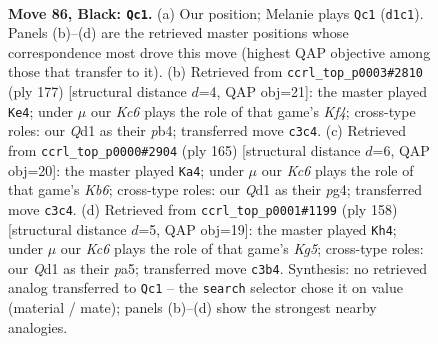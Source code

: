 \documentclass[11pt]{article}
\begin{document}
\clearpage

\begin{figure}[p]\centering
\begin{subfigure}{0.46\textwidth}\centering
\resizebox{\linewidth}{!}{%
\newchessgame
\chessboard[
  setfen={8/8/1p6/p7/2P5/2k5/K7/3q4 b - - 29 86},
  showmover=false,
  pgfstyle=straightmove, color=movearrow, markmove={d1-c1}
]}
\caption{}
\end{subfigure}\hfill
\begin{subfigure}{0.46\textwidth}\centering
\resizebox{\linewidth}{!}{%
\newchessgame
\chessboard[
  setfen={8/6p1/6Pp/5k2/1P6/6K1/8/8 b - - 10 89},
  showmover=false,
  pgfstyle=straightmove, color=movearrow, markmove={f5-e4}
]}
\caption{}
\end{subfigure}
\\[4pt]
\begin{subfigure}{0.46\textwidth}\centering
\resizebox{\linewidth}{!}{%
\newchessgame
\chessboard[
  setfen={8/8/8/6p1/5pP1/1kPK4/8/8 b - - 2 83},
  showmover=false,
  pgfstyle=straightmove, color=movearrow, markmove={b3-a4}
]}
\caption{}
\end{subfigure}\hfill
\begin{subfigure}{0.46\textwidth}\centering
\resizebox{\linewidth}{!}{%
\newchessgame
\chessboard[
  setfen={8/5k2/8/p5Kp/2P5/1P6/8/8 w - - 7 80},
  showmover=false,
  pgfstyle=straightmove, color=movearrow, markmove={g5-h4}
]}
\caption{}
\end{subfigure}
\caption{\textbf{Move 86, Black: \texttt{Qc1}.} (a) Our position; Melanie plays \texttt{Qc1} (\texttt{d1c1}). Panels (b)--(d) are the retrieved master positions whose correspondence most drove this move (highest QAP objective among those that transfer to it). (b) Retrieved from \texttt{ccrl\_top\_p0003\#2810} (ply 177) [structural distance $d$=4, QAP obj=21]: the master played \texttt{Ke4}; under $\mu$ our \emph{Kc6} plays the role of that game's \emph{Kf4}; cross-type roles: our \emph{Q}d1 as their \emph{p}b4; transferred move \texttt{c3c4}. (c) Retrieved from \texttt{ccrl\_top\_p0000\#2904} (ply 165) [structural distance $d$=6, QAP obj=20]: the master played \texttt{Ka4}; under $\mu$ our \emph{Kc6} plays the role of that game's \emph{Kb6}; cross-type roles: our \emph{Q}d1 as their \emph{p}g4; transferred move \texttt{c3c4}. (d) Retrieved from \texttt{ccrl\_top\_p0001\#1199} (ply 158) [structural distance $d$=5, QAP obj=19]: the master played \texttt{Kh4}; under $\mu$ our \emph{Kc6} plays the role of that game's \emph{Kg5}; cross-type roles: our \emph{Q}d1 as their \emph{p}a5; transferred move \texttt{c3b4}. Synthesis: no retrieved analog transferred to \texttt{Qc1} -- the \texttt{search} selector chose it on value (material / mate); panels (b)--(d) show the strongest nearby analogies.}
\label{fig:thought-m171}
\end{figure}
\end{document}
